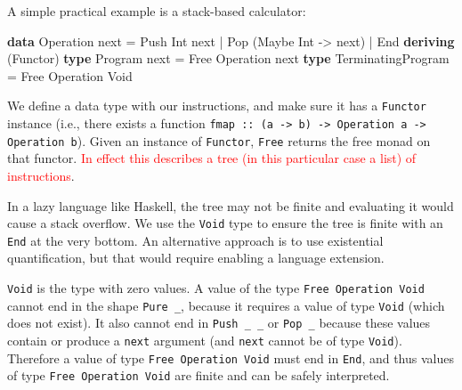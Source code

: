 \documentclass[runningheads,plain]{llncs}
\newcommand{\checkthis}[1]{\textcolor{red}{#1}}
\newenvironment{Shaded}{}{}
\newcommand{\KeywordTok}[1]{\textcolor[rgb]{0.00,0.44,0.13}{\textbf{#1}}}
\newcommand{\DataTypeTok}[1]{\textcolor[rgb]{0.56,0.13,0.00}{#1}}
\newcommand{\OtherTok}[1]{\textcolor[rgb]{0.00,0.44,0.13}{#1}}
\newcommand{\FunctionTok}[1]{\textcolor[rgb]{0.02,0.16,0.49}{#1}}
\newcommand{\NormalTok}[1]{#1}
\begin{document}
A simple practical example is a stack-based calculator:
\begin{Shaded}
\begin{Highlighting}[]
\KeywordTok{data} \DataTypeTok{Operation}\NormalTok{ next  }
    \FunctionTok{=} \DataTypeTok{Push} \DataTypeTok{Int}\NormalTok{ next}
    \FunctionTok{|} \DataTypeTok{Pop}\NormalTok{ (}\DataTypeTok{Maybe} \DataTypeTok{Int} \OtherTok{->}\NormalTok{ next) }
    \FunctionTok{|} \DataTypeTok{End}
    \KeywordTok{deriving}\NormalTok{ (}\DataTypeTok{Functor}\NormalTok{)  }
\KeywordTok{type} \DataTypeTok{Program}\NormalTok{ next }\FunctionTok{=} \DataTypeTok{Free} \DataTypeTok{Operation}\NormalTok{ next}
\KeywordTok{type} \DataTypeTok{TerminatingProgram} \FunctionTok{=} \DataTypeTok{Free} \DataTypeTok{Operation} \DataTypeTok{Void}
\end{Highlighting}
\end{Shaded}

We define a data type with our instructions, and make sure it has a \texttt{Functor} instance (i.e., there exists a function \texttt{fmap :: (a -> b) -> Operation a -> Operation b}).
Given an instance of \texttt{Functor}, \texttt{Free} returns the free monad on that functor. 
\checkthis{In effect this describes a tree (in this particular case a list) of instructions}. 

In a lazy language like Haskell, the tree may not be finite and
evaluating it would cause a stack overflow. We use the \texttt{Void} type
to ensure the tree is finite with an \texttt{End} at the very bottom. An
alternative approach is to use existential quantification, but that would 
require enabling a language extension.

 \texttt{Void}  is the type with zero values. A value of the type
\texttt{Free\ Operation\ Void} cannot end in the shape
\texttt{Pure\ \_}, because it requires a value of type \texttt{Void}
(which does not exist). It also cannot end in \texttt{Push\ \_\ \_} or
\texttt{Pop\ \_} because these values contain or produce a \texttt{next}
argument (and \texttt{next} cannot be of type \texttt{Void}). Therefore a value of type \texttt{Free\ Operation\ Void} must end in \texttt{End}, 
and thus values of type \texttt{Free\ Operation\ Void} are finite and can be safely interpreted.
\end{document}
